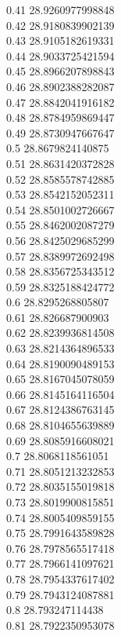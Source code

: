 {0.41	28.9260977998848\\
0.42	28.9180839902139\\
0.43	28.9105182619331\\
0.44	28.9033725421594\\
0.45	28.8966207898843\\
0.46	28.8902388282087\\
0.47	28.8842041916182\\
0.48	28.8784959869447\\
0.49	28.8730947667647\\
0.5	28.8679824140875\\
0.51	28.8631420372828\\
0.52	28.8585578742885\\
0.53	28.8542152052311\\
0.54	28.8501002726667\\
0.55	28.8462002087279\\
0.56	28.8425029685299\\
0.57	28.8389972692498\\
0.58	28.8356725343512\\
0.59	28.8325188424772\\
0.6	28.8295268805807\\
0.61	28.826687900903\\
0.62	28.8239936814508\\
0.63	28.8214364896533\\
0.64	28.8190090489153\\
0.65	28.8167045078059\\
0.66	28.8145164116504\\
0.67	28.8124386763145\\
0.68	28.8104655639889\\
0.69	28.8085916608021\\
0.7	28.8068118561051\\
0.71	28.8051213232853\\
0.72	28.8035155019818\\
0.73	28.8019900815851\\
0.74	28.8005409859155\\
0.75	28.7991643589828\\
0.76	28.7978565517418\\
0.77	28.7966141097621\\
0.78	28.7954337617402\\
0.79	28.7943124087881\\
0.8	28.793247114438\\
0.81	28.7922350953078\\
}
